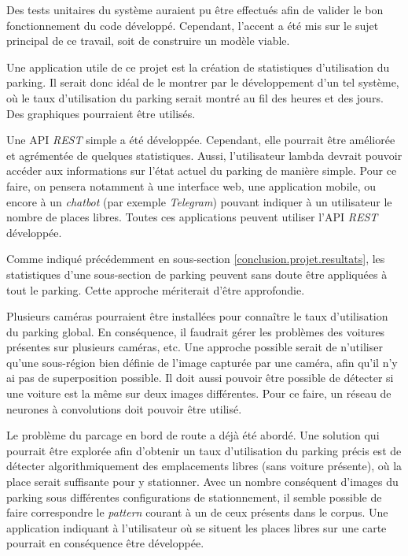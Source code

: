 Des tests unitaires du système auraient pu être effectués afin de valider le bon fonctionnement du code développé. Cependant, l'accent a été mis sur le sujet principal de ce travail, soit de construire un modèle viable.

Une application utile de ce projet est la création de statistiques d'utilisation du parking. Il serait donc idéal de le montrer par le développement d'un tel système, où le taux d'utilisation du parking serait montré au fil des heures et des jours. Des graphiques pourraient être utilisés.

Une API \textit{REST} simple a été développée. Cependant, elle pourrait être améliorée et agrémentée de quelques statistiques. Aussi, l'utilisateur lambda devrait pouvoir accéder aux informations sur l'état actuel du parking de manière simple. Pour ce faire, on pensera notamment à une interface web, une application mobile, ou encore à un \textit{chatbot} (par exemple \textit{Telegram}) pouvant indiquer à un utilisateur le nombre de places libres. Toutes ces applications peuvent utiliser l'API \textit{REST} développée. 

Comme indiqué précédemment en sous-section \ref{conclusion.projet.resultats}, les statistiques d'une sous-section de parking peuvent sans doute être appliquées à tout le parking. Cette approche mériterait d'être approfondie.

Plusieurs caméras pourraient être installées pour connaître le taux d'utilisation du parking global. En conséquence, il faudrait gérer les problèmes des voitures présentes sur plusieurs caméras, etc. Une approche possible serait de n'utiliser qu'une sous-région bien définie de l'image capturée par une caméra, afin qu'il n'y ai pas de superposition possible. Il doit aussi pouvoir être possible de détecter si une voiture est la même sur deux images différentes. Pour ce faire, un réseau de neurones à convolutions doit pouvoir être utilisé.

Le problème du parcage en bord de route a déjà été abordé. Une solution qui pourrait être explorée afin d'obtenir un taux d'utilisation du parking précis est de détecter algorithmiquement des emplacements libres (sans voiture présente), où la place serait suffisante pour y stationner. Avec un nombre conséquent d'images du parking sous différentes configurations de stationnement, il semble possible de faire correspondre le \textit{pattern} courant à un de ceux présents dans le corpus. Une application indiquant à l'utilisateur où se situent les places libres sur une carte pourrait en conséquence être développée.

